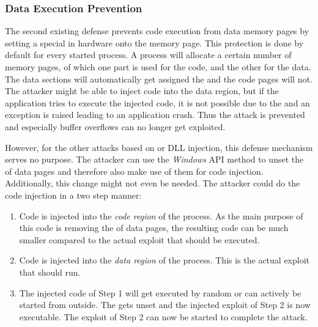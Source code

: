 \subsubsection{Data Execution Prevention}
\label{sec:dep}
The second existing defense prevents code execution from data memory pages by setting a special  \cite{msdn_dep} in hardware onto the memory page. This protection is done by default for every started process. A process will allocate a certain number of memory pages, of which one part is used for the code, and the other for the data. The data sections will automatically get assigned the  and the code pages will not. The attacker might be able to inject code into the data region, but if the application tries to execute the injected code, it is not possible due to the  and an exception is raised leading to an application crash. Thus the attack is prevented and especially buffer overflows can no longer get exploited.

However, for the other attacks based on  or \gls{DLL} injection, this defense mechanism serves no purpose. The attacker can use the \emph{Windows} \gls{API} method  \cite{msdn_virtualprotect} to unset the  of data pages and therefore also make use of them for code injection. Additionally, this change might not even be needed. The attacker could do the code injection in a two step manner: 
\begin{enumerate}
\item Code is injected into the \emph{code region} of the process. As the main purpose of this code is removing the  of data pages, the resulting code can be much smaller compared to the actual exploit that should be executed.
\item Code is injected into the \emph{data region} of the process. This is the actual exploit that should run.
\item The injected code of Step 1 will get executed by random or can actively be started from outside. The  gets unset and the injected exploit of Step 2 is now executable. The exploit of Step 2 can now be started to complete the attack.
\end{enumerate}